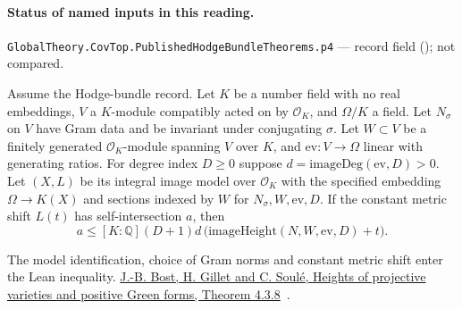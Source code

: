 

\paragraph{Status of named inputs in this reading.}
\noindent\nolinkurl{GlobalTheory.CovTop.PublishedHodgeBundleTheorems.p4} --- record field (); not compared.\par

\begin{formalstatement}\label{sub:T16}

Assume the Hodge-bundle record. Let $K$ be a number field with no real
embeddings, $V$ a $K$-module compatibly acted on by $\mathcal O_K$, and
$\Omega/K$ a field. Let $N_\sigma$ on $V$ have Gram data and be invariant
under conjugating $\sigma$. Let $W\subset V$ be a finitely generated
$\mathcal O_K$-module spanning $V$ over $K$, and
$\mathrm{ev}:V\to\Omega$ linear with generating ratios. For degree index
$D\ge0$ suppose $d=\mathrm{imageDeg}(\mathrm{ev},D)>0$.
Let $(X,L)$ be its integral image model over $\mathcal O_K$ with the
specified embedding $\Omega\to K(X)$ and sections indexed by $W$ for
$N_\sigma,W,\mathrm{ev},D$. If the constant metric shift $L(t)$ has
self-intersection $a$, then
\[
 a\le [K:\mathbb Q](D+1)d\,
       \bigl(\mathrm{imageHeight}(N,W,\mathrm{ev},D)+t\bigr).
\]

\end{formalstatement}

\noindent The model identification, choice of Gram norms and constant metric shift enter the Lean inequality. \href{https://doi.org/10.1090/S0894-0347-1994-1260106-X}{J.-B. Bost, H. Gillet and C. Soulé, Heights of projective varieties and positive Green forms, Theorem 4.3.8}~\cite{r21-bgs}.
